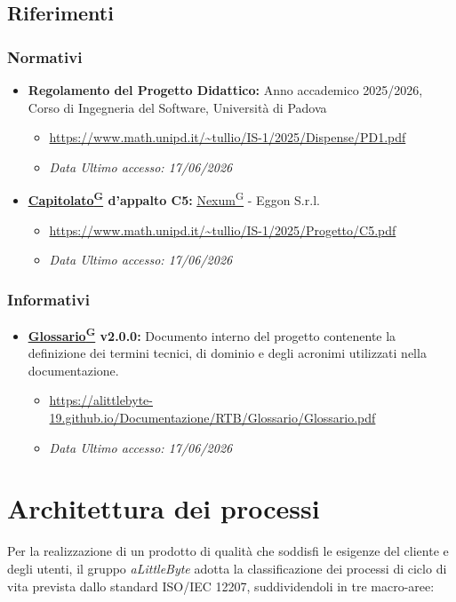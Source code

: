 \documentclass[a4paper,12pt]{article}
\providecommand{\glslink}[2]{\href{https://alittlebyte-19.github.io/Documentazione/glossario.html\#gls-#1}{\underline{#2}\textsuperscript{\scriptsize G}}}
\begin{document}
\subsection{Riferimenti}

\subsubsection{Normativi}
\begin{itemize}
    \item \textbf{Regolamento del Progetto Didattico:} Anno accademico 2025/2026, Corso di Ingegneria del Software, Università di Padova
    \begin{itemize}
        \item \url{https://www.math.unipd.it/~tullio/IS-1/2025/Dispense/PD1.pdf}
        \item \textit{Data Ultimo accesso: 17/06/2026} 
    \end{itemize}
    
    
    \item \textbf{\glslink{capitolato}{Capitolato} d'appalto C5:} \glslink{nexum}{Nexum} - Eggon S.r.l.
    \begin{itemize}
        \item \url{https://www.math.unipd.it/~tullio/IS-1/2025/Progetto/C5.pdf}
        \item \textit{Data Ultimo accesso: 17/06/2026} 
    \end{itemize}
    
\end{itemize}

\subsubsection{Informativi}
\begin{itemize}
    \item \textbf{\glslink{glossario}{Glossario} v2.0.0:} Documento interno del progetto contenente la definizione dei termini tecnici, di dominio e degli acronimi utilizzati nella documentazione.
    \begin{itemize}
        \item \url{https://alittlebyte-19.github.io/Documentazione/RTB/Glossario/Glossario.pdf}
        \item \textit{Data Ultimo accesso: 17/06/2026}
    \end{itemize}
\end{itemize}
\section{Architettura dei processi}
Per la realizzazione di un prodotto di qualità che soddisfi le esigenze del cliente e degli utenti, il gruppo \textit{aLittleByte} adotta la classificazione dei processi di ciclo di vita prevista dallo standard ISO/IEC 12207, suddividendoli in tre macro-aree:
\end{document}
